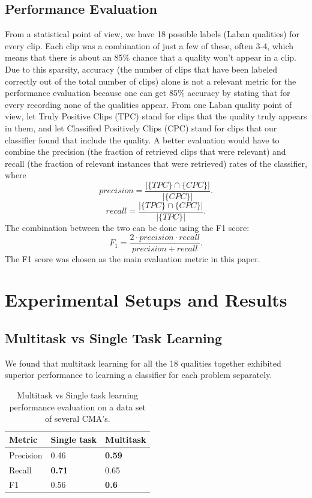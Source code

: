\documentclass{sigchi}
\begin{document}
\subsection{Performance Evaluation}
From a statistical point of view, we have 18 possible labels (Laban qualities) for every clip. 
Each clip was a combination of just a few of these, often 3-4, which means that there is about 
an 85\% chance that a quality won't appear in a clip. Due to this sparsity,
accuracy (the number of clips that have been labeled correctly out of the
total number of clips) alone is not a relevant metric for the performance
evaluation because one can get 85\% accuracy by stating that for every recording none of the qualities appear.
From one Laban quality point of view, let Truly Positive Clips (TPC) stand for clips that the quality truly appears in them, and let Classified Positively Clips (CPC) stand for clips that our classifier found that include the quality. A better evaluation would have to combine the precision (the fraction of retrieved clips that were relevant) and recall (the fraction of relevant instances that were retrieved) rates of the
classifier, where
\begin{equation*}
precision = \frac{|\{TPC\}\cap\{CPC\}|}{|\{CPC\}|}.
\end{equation*}
\begin{equation*}
recall = \frac{|\{TPC\}\cap\{CPC\}|}{|\{TPC\}|}.
\end{equation*}
 The combination between the two can be done using the F1 score:
\begin{equation*}
F_{1} = \frac{2\cdot precision\cdot recall}{precision+recall}.
\end{equation*}
The F1 score was chosen as the main evaluation metric in this paper.
\section{Experimental Setups and Results}

\subsection{Multitask vs Single Task Learning}
We found that multitask learning for all the 18 qualities together exhibited superior
performance to learning a classifier for each problem separately.
\begin{table}[ht]
\centering
\begin{tabular}{|p{1.8cm}|p{1.8cm}|p{1.8cm}|}
\hline
Metric&Single task&Multitask\\\hline
Precision&0.46&\textbf{0.59}\\\hline
Recall&\textbf{0.71}&0.65\\\hline
F1&0.56&\textbf{0.6}\\\hline
\end{tabular}
\caption{Multitask vs Single task learning performance evaluation on a data set of several CMA's.}
\label{MultitaskVsSeparated}
\end{table}
\end{document}
